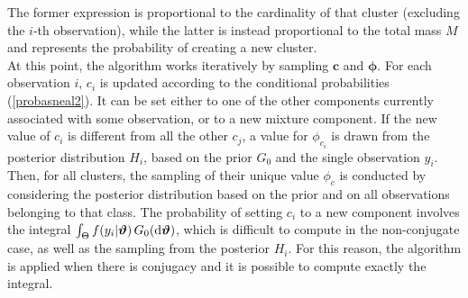 The former expression is proportional to the cardinality of that cluster (excluding the $i$-th observation), while the latter is instead proportional to the total mass $M$ and represents the probability of creating a new cluster. \\
At this point, the algorithm works iteratively by sampling $\boldsymbol c$ and $\boldsymbol\phi$.
For each observation $i$, $c_i$ is updated according to the conditional probabilities (\ref{probasneal2}).
It can be set either to one of the other components currently associated with some observation, or to a new mixture component.
If the new value of $c_i$ is different from all the other $c_j$, a value for $\phi_{c_i}$ is drawn from the posterior distribution $H_i$, based on the prior $G_0$ and the single observation $y_i$.
Then, for all clusters, the sampling of their unique value $\phi_c$ is conducted by considering the posterior distribution based on the prior and on all observations belonging to that class.
The probability of setting $c_i$ to a new component involves the integral $\int_{\Theta} f(y_{i}|\boldsymbol{\vartheta}) \, G_0(\mathrm d\boldsymbol{\vartheta})$, which is difficult to compute in the non-conjugate case, as well as the sampling from the posterior $H_i$.
For this reason, the algorithm is applied when there is conjugacy and it is possible to compute exactly the integral.

